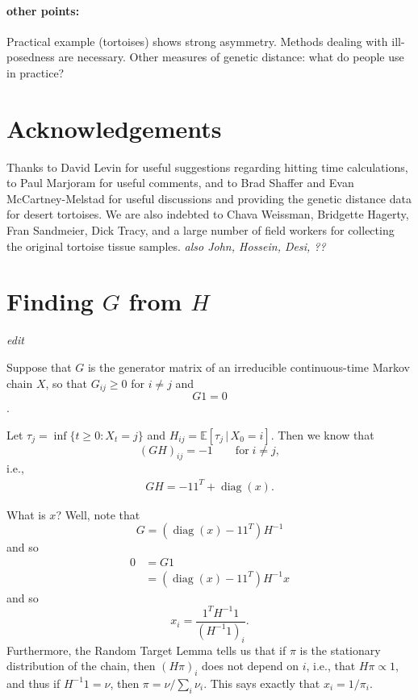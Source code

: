 \documentclass{article}
\DeclareMathOperator{\diag}{\mathop{\mbox{diag}}}
\newcommand{\E}{\mathbb{E}}
\newcommand{\plr}[1]{{\em \color{blue} #1}}
\begin{document}
\paragraph{other points:}
Practical example (tortoises) shows strong asymmetry.
Methods dealing with ill-posedness are necessary.
Other measures of genetic distance: what do people use in practice?


\section*{Acknowledgements}

Thanks to David Levin for useful suggestions regarding hitting time calculations,
to Paul Marjoram for useful comments,
and to Brad Shaffer and Evan McCartney-Melstad for useful discussions
and providing the genetic distance data for desert tortoises.
We are also indebted to Chava Weissman, Bridgette Hagerty, Fran Sandmeier, Dick Tracy,
and a large number of field workers for collecting the original tortoise tissue samples.
\plr{also John, Hossein, Desi, ??}




\appendix
\renewcommand{\thefigure}{S\arabic{figure}}
\setcounter{figure}{0}


\section{Finding $G$ from $H$}
\label{apx::hitting_calcs}

\plr{edit}

Suppose that $G$ is the generator matrix of an irreducible continuous-time Markov chain $X$,
so that $G_{ij} \ge 0$ for $i \neq j$ and
$$ G 1 = 0 $$.

Let $\tau_{j} = \inf\{t \ge 0 : X_t = j\}$ and $H_{ij} = \E[\tau_j \,|\, X_0 = i]$.
Then we know that
$$
    (G H)_{ij} = -1 \qquad \text{for} \; i \neq j ,
$$
i.e.,
\begin{align} \label{eqn:GH}
    GH = - 1 1^T + \diag(x).
\end{align}

What is $x$?  Well, note that
$$
    G = (\diag(x) - 1 1^T) H^{-1}
$$
and so
$$ \begin{aligned}
    0 &= G1 \\
    &= (\diag(x) - 1 1^T) H^{-1} x 
\end{aligned} $$
and so
$$
    x_i = \frac{ 1^T H^{-1} 1 }{ (H^{-1} 1)_i } .
$$
Furthermore,
the Random Target Lemma \citep{aldous} %
tells us that if $\pi$ is the stationary distribution of the chain, then 
$(H \pi)_i$ does not depend on $i$,
i.e., that $H \pi \propto 1$,
and thus if $H^{-1} 1 = \nu$, 
then $\pi = \nu / \sum_i \nu_i$.
This says exactly that $x_i = 1/\pi_i$.
\end{document}
